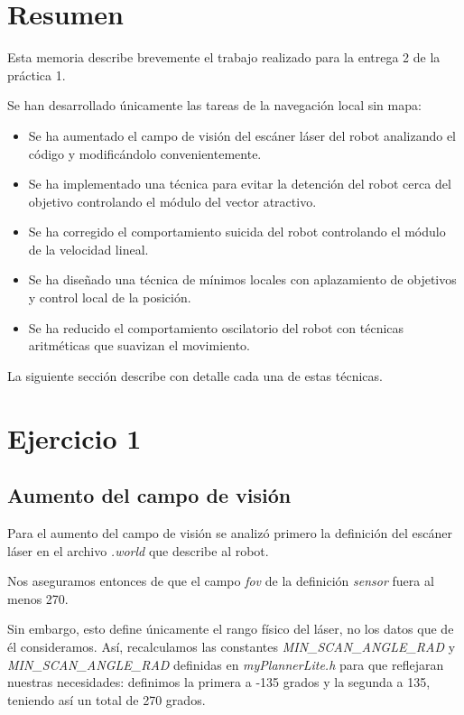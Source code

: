 \documentclass[a4paper, 11pt, titlepage]{article}
\begin{document}
  \maketitle
  \tableofcontents
  \newpage

  \section{Resumen}
  Esta memoria describe brevemente el trabajo realizado para la entrega 2 de la práctica 1.

  Se han desarrollado únicamente las tareas de la navegación local sin mapa:
  \begin{itemize}
      \item Se ha aumentado el campo de visión del escáner láser del robot analizando el código y modificándolo convenientemente.
      \item Se ha implementado una técnica para evitar la detención del robot cerca del objetivo controlando el módulo del vector atractivo.
      \item Se ha corregido el comportamiento suicida del robot controlando el módulo de la velocidad lineal.
      \item Se ha diseñado una técnica de mínimos locales con aplazamiento de objetivos y control local de la posición.
      \item Se ha reducido el comportamiento oscilatorio del robot con técnicas aritméticas que suavizan el movimiento.
  \end{itemize}

  La siguiente sección describe con detalle cada una de estas técnicas.

  \section{Ejercicio 1}

  \subsection{Aumento del campo de visión}
  Para el aumento del campo de visión se analizó primero la definición del escáner láser en el archivo \emph{.world} que describe al robot.

  Nos aseguramos entonces de que el campo \emph{fov} de la definición \emph{sensor} fuera al menos 270.

  Sin embargo, esto define únicamente el rango físico del láser, no los datos que de él consideramos. Así, recalculamos las constantes \emph{MIN\_SCAN\_ANGLE\_RAD} y \emph{MIN\_SCAN\_ANGLE\_RAD} definidas en \emph{myPlannerLite.h} para que reflejaran nuestras necesidades: definimos la primera  a -135 grados y la segunda a 135, teniendo así un total de 270 grados.
\end{document}

